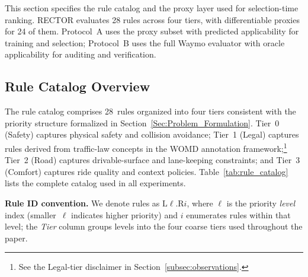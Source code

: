 This section specifies the rule catalog and the proxy layer used for selection-time ranking. RECTOR evaluates 28 rules across four tiers, with differentiable proxies for 24 of them. Protocol~A uses the proxy subset with predicted applicability for training and selection; Protocol~B uses the full Waymo evaluator with oracle applicability for auditing and verification.

\subsection{Rule Catalog Overview}
\label{subsec:rule_catalog}

The rule catalog comprises 28~rules organized into four tiers consistent with the priority structure formalized in Section~\ref{Sec:Problem_Formulation}.  Tier~0 (Safety) captures physical safety and collision avoidance; Tier~1 (Legal) captures rules derived from traffic-law concepts in the WOMD annotation framework;\footnote{See the Legal-tier disclaimer in Section~\ref{subsec:observations}.} Tier~2 (Road) captures drivable-surface and lane-keeping constraints; and Tier~3 (Comfort) captures ride quality and context policies. Table~\ref{tab:rule_catalog} lists the complete catalog used in all experiments.

\noindent\textbf{Rule ID convention.}  We denote rules as $\mathrm{L}\ell.\mathrm{R}i$, where $\ell$ is the priority \emph{level} index (smaller~$\ell$ indicates higher priority) and $i$ enumerates rules within that level; the \emph{Tier} column groups levels into the four coarse tiers used throughout the paper.

